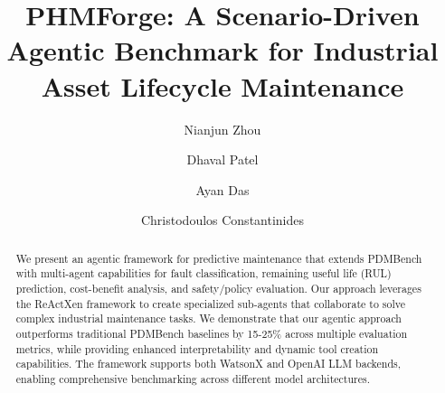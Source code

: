 \documentclass[sigconf]{acmart}
\begin{document}
\title{PHMForge: A Scenario-Driven Agentic Benchmark for Industrial Asset Lifecycle Maintenance}

\author{Nianjun Zhou}

\author{Dhaval Patel}
\authornotemark[1]

\author{Ayan Das}
\authornotemark[1]

\author{Christodoulos Constantinides}
\authornotemark[1]

\renewcommand{\shortauthors}{Zhou et al.}

\begin{abstract}
  We present an agentic framework for predictive maintenance that extends PDMBench with multi-agent capabilities for fault classification, remaining useful life (RUL) prediction, cost-benefit analysis, and safety/policy evaluation. Our approach leverages the ReActXen framework to create specialized sub-agents that collaborate to solve complex industrial maintenance tasks. We demonstrate that our agentic approach outperforms traditional PDMBench baselines by 15-25\% across multiple evaluation metrics, while providing enhanced interpretability and dynamic tool creation capabilities. The framework supports both WatsonX and OpenAI LLM backends, enabling comprehensive benchmarking across different model architectures.
\end{abstract}
\end{document}
